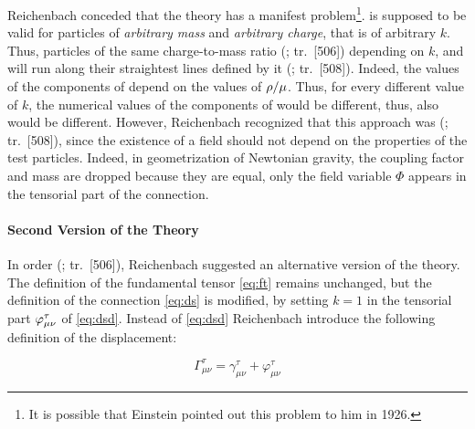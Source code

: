 \documentclass[submitted]{article}
\newcommand{\ctmr}{charge-to-mass ratio\xspace}
\newcommand{\ctmrd}{\ensuremath{\hfrac{\rho}{\mu}}\xspace}
\renewcommand{\rzlap}[2]{(\cite[#1]{Reichenbach1928}; tr.\ [#2])\xspace}
\begin{document}

Reichenbach conceded that the theory has a manifest problem\footnote{It is possible that Einstein pointed out this problem to him in 1926. }.  is supposed to be valid for particles of \emph{arbitrary mass} and \emph{arbitrary charge}, that is of arbitrary $k$. Thus,  particles of the same \ctmr {} \rzlap{362}{506} depending on $k$, and will run along their  straightest lines defined by it \rzlap{363}{508}. Indeed, the values of the components of  \Gtmn depend on the values of \ctmrd. Thus, for every different value of $k$, the numerical values of the components of \Gtmn would be different, thus, also \ritea would be different. However, Reichenbach recognized that this approach was  \rzlap{363}{508}, since the existence of a field should not depend on the properties of the test particles. Indeed, in  geometrization of Newtonian gravity, the coupling factor and mass are dropped because they are equal, only the field variable $\Phi$ appears in the tensorial part of the connection.

\paragraph{Second Version of the Theory}
\label{RTt}

In order  \rzlap{367}{506}, Reichenbach suggested an alternative version of the theory. The definition of the fundamental tensor \cref{eq:ft} remains unchanged, but the definition of the connection \cref{eq:ds} is modified, by setting $k=1$ in the tensorial part $\varphi^\tau_{\mu\nu}$ of \cref{eq:dsd}. Instead of \cref{eq:dsd} Reichenbach introduce the following definition of the displacement:

\begin{equation*}
\Gamma_{\mu \nu}^{\tau}=\gamma_{\mu \nu}^{\tau}+\varphi_{\mu \nu}^{\tau}
\end{equation*}
\end{document}
